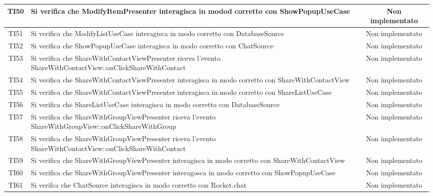 \begin{center}
\begin{longtable}{|c|>{\centering}m{10cm}|c|}
		TI50 & Si verifica che ModifyItemPresenter interagisca in modod corretto con ShowPopupUseCase & Non implementato \\ \hline
		TI51 & Si verifica che ModifyListUseCase interagisca in modo corretto con DatabaseSource & Non implementato \\ \hline
		TI52 & Si verifica che ShowPopupUseCase interagisca in modo corretto con ChatSource & Non implementato \\ \hline
		TI53 & Si verifica che ShareWithContactViewPresenter riceva l'evento ShareWithContactView::onClickShareWithContact & Non implementato \\ \hline
		TI54 & Si verifica che ShareWithContactViewPresenter interagisca in modo corretto con ShareWithContactView & Non implementato \\ \hline
		TI55 & Si verifica che ShareWithContactViewPresenter interagisca in modo corretto con ShareListUseCase & Non implementato \\ \hline
		TI56 & Si verifica che ShareListUseCase interagisca in modo corretto con DatabaseSource & Non implementato \\ \hline
		TI57 & Si verifica che ShareWithGroupViewPresenter riceva l'evento ShareWithGroupView::onClickShareWithGroup & Non implementato \\ \hline
		TI58 & Si verifica che ShareWithGroupViewPresenter riceva l'evento ShareWithContactView::onClickShareWithContact & Non implementato \\ \hline
		TI59 & Si verifica che ShareWithGroupViewPresenter interagisca in modo corretto con ShareWithContactView & Non implementato \\ \hline
		TI60 & Si verifica che ShareWithGroupViewPresenter interagosca in modo corretto con ShowPopupUseCase & Non implementato \\ \hline
		TI61 & Si verifca che ChatSource interagisca in modo corretto con Rocket.chat & Non implementato \\ \hline
	\end{longtable}
\end{center}
